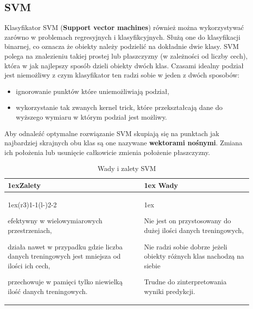 \subsection{SVM}

Klasyfikator SVM (\textbf{Support vector machines}) również można wykorzystywać zarówno 
w problemach regresyjnych i klasyfikcyjnych. Służą one do klasyfikacji binarnej, co 
oznacza że obiekty należy podzielić na dokładnie dwie klasy. SVM polega na znalezieniu
takiej prostej lub płaszczyzny (w zależności od liczby cech), która w jak najlepszy sposób
dzieli obiekty dwóch klas. Czasami idealny podział jest niemożliwy z czym klasyfikator 
ten radzi sobie w jeden z dwóch sposobów:
\begin{itemize}
    \item ignorowanie punktów które uniemożliwiają podział,
    \item wykorzystanie tak zwanych kernel trick, które przekształcają dane do wyższego 
    wymiaru w którym podział jest możliwy.
\end{itemize}
Aby odnaleźć optymalne rozwiązanie SVM skupiają się na punktach jak najbardziej skrajnych
obu klas są one nazywane \textbf{wektorami nośnymi}. Zmiana ich położenia lub usunięcie
całkowicie zmienia położenie płaszczyzny.

\begin{table}[h]
    \begin{tabularx}{\linewidth}{>{\parskip1ex}X@{\kern4\tabcolsep}>{\parskip1ex}X}
    \toprule
    \hfil\bfseries Zalety
    &
    \hfil\bfseries Wady
    \\\cmidrule(r{3\tabcolsep}){1-1}\cmidrule(l{-\tabcolsep}){2-2}
    
    efektywny w wielowymiarowych przestrzeniach,\par
    działa nawet w przypadku gdzie liczba danych treningowych jest mniejsza od
    ilości ich cech,\par
    przechowuje w pamięci tylko niewielką ilość danych treningowych.\par
    
    &
    
    Nie jest on przystosowany do dużej ilości danych treningowych,\par
    Nie radzi sobie dobrze jeżeli obiekty różnych klas nachodzą na siebie\par
    Trudne do zinterpretowania wyniki predykcji.
    
    \\\bottomrule
    \end{tabularx}
    \caption{Wady i zalety SVM}
\end{table}

